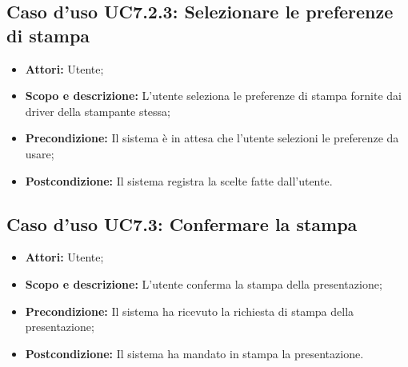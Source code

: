 	\subsection{Caso d'uso UC7.2.3: Selezionare le preferenze di stampa}
	\begin{itemize}
		\item \textbf{Attori:} Utente;
		\item \textbf{Scopo e descrizione:} L'utente seleziona le preferenze di stampa fornite dai driver della stampante stessa;
		\item \textbf{Precondizione:} Il sistema è in attesa che l'utente selezioni le preferenze da usare;
		\item \textbf{Postcondizione:} Il sistema registra la scelte fatte dall'utente.
	\end{itemize}


\subsection{Caso d'uso UC7.3: Confermare la stampa}
\begin{itemize}
	\item \textbf{Attori:} Utente;
	\item \textbf{Scopo e descrizione:} L'utente conferma la stampa della presentazione;
	\item \textbf{Precondizione:} Il sistema ha ricevuto la richiesta di stampa della presentazione;
	\item \textbf{Postcondizione:} Il sistema ha mandato in stampa la presentazione.
\end{itemize}

\newpage